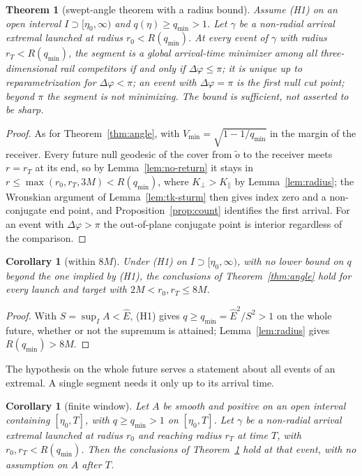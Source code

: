\documentclass[aip,jmp,amsmath,amssymb,reprint]{revtex4-2}
\newcommand{\Ehat}{\hat E}
\theoremstyle{plain}
\newtheorem{theorem}{Theorem}
\newtheorem{corollary}[proposition]{Corollary}
\theoremstyle{definition}
\begin{document}
\begin{theorem}[swept-angle theorem with a radius bound]\label{thm:angle-radius}
Assume (H1) on an open interval $I\supset[\eta_0,\infty)$ and $q(\eta)\ge q_{\min}>1$. Let $\gamma$ be a
non-radial arrival extremal launched at radius $r_0<R(q_{\min})$. At every event of $\gamma$ with
radius $r_T<R(q_{\min})$, the segment is a global arrival-time minimizer among all
three-dimensional rail competitors if and only if $\Delta\varphi\le\pi$; it is unique up to
reparametrization for $\Delta\varphi<\pi$; an event with $\Delta\varphi=\pi$ is the first null cut point;
beyond $\pi$ the segment is not minimizing. The bound is sufficient, not asserted to be sharp.
\end{theorem}

\begin{proof}
As for Theorem~\ref{thm:angle}, with $V_{\min}=\sqrt{1-1/q_{\min}}$ in the margin of the receiver. Every
future null geodesic of the cover from $\tilde o$ to the receiver meets $r=r_T$ at its end, so by
Lemma~\ref{lem:no-return} it stays in $r\le\max(r_0,r_T,3M)<R(q_{\min})$, where $K_\perp>K_\parallel$ by
Lemma~\ref{lem:radius}; the Wronskian argument of Lemma~\ref{lem:tk-sturm} then gives index zero and a
non-conjugate end point, and Proposition~\ref{prop:count} identifies the first arrival. For an event
with $\Delta\varphi>\pi$ the out-of-plane conjugate point is interior regardless of the comparison.
\end{proof}

\begin{corollary}[within $8M$]\label{cor:within8M}
Under (H1) on $I\supset[\eta_0,\infty)$, with no lower bound on $q$ beyond the one implied by (H1), the
conclusions of Theorem~\ref{thm:angle} hold for every launch and target with $2M<r_0,r_T\le8M$.
\end{corollary}

\begin{proof}
With $S=\sup_IA<\Ehat$, (H1) gives $q\ge q_{\min}=\Ehat^2/S^2>1$ on the whole future, whether or not the
supremum is attained; Lemma~\ref{lem:radius} gives $R(q_{\min})>8M$.
\end{proof}

The hypothesis on the whole future serves a statement about all events of an extremal. A single
segment needs it only up to its arrival time.

\begin{corollary}[finite window]\label{cor:finite-window}
Let $A$ be smooth and positive on an open interval containing $[\eta_0,T]$, with $q\ge q_{\min}>1$ on
$[\eta_0,T]$. Let $\gamma$ be a non-radial arrival extremal launched at radius $r_0$ and reaching radius $r_T$
at time $T$, with $r_0,r_T<R(q_{\min})$. Then the conclusions of Theorem~\ref{thm:angle-radius} hold at that
event, with no assumption on $A$ after $T$.
\end{corollary}
\end{document}
